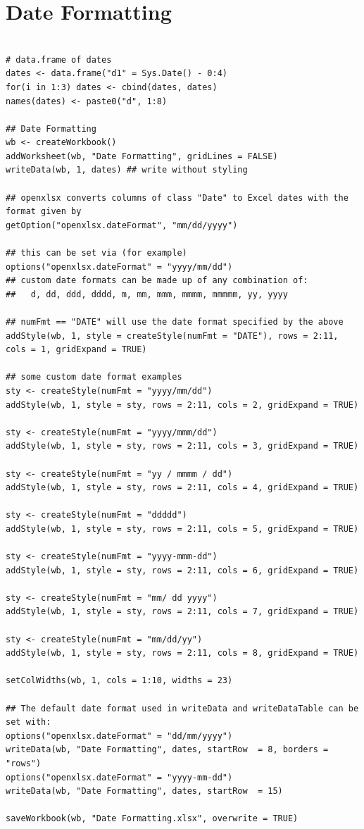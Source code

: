 \documentclass[11pt]{article}\usepackage[]{graphicx}\usepackage[]{color}
\begin{document}
\section{Date Formatting}
\begin{verbatim}

# data.frame of dates
dates <- data.frame("d1" = Sys.Date() - 0:4)
for(i in 1:3) dates <- cbind(dates, dates)
names(dates) <- paste0("d", 1:8)

## Date Formatting
wb <- createWorkbook()
addWorksheet(wb, "Date Formatting", gridLines = FALSE)
writeData(wb, 1, dates) ## write without styling

## openxlsx converts columns of class "Date" to Excel dates with the format given by
getOption("openxlsx.dateFormat", "mm/dd/yyyy")

## this can be set via (for example)
options("openxlsx.dateFormat" = "yyyy/mm/dd")
## custom date formats can be made up of any combination of:
##   d, dd, ddd, dddd, m, mm, mmm, mmmm, mmmmm, yy, yyyy

## numFmt == "DATE" will use the date format specified by the above
addStyle(wb, 1, style = createStyle(numFmt = "DATE"), rows = 2:11, cols = 1, gridExpand = TRUE) 

## some custom date format examples
sty <- createStyle(numFmt = "yyyy/mm/dd")
addStyle(wb, 1, style = sty, rows = 2:11, cols = 2, gridExpand = TRUE)

sty <- createStyle(numFmt = "yyyy/mmm/dd")
addStyle(wb, 1, style = sty, rows = 2:11, cols = 3, gridExpand = TRUE)

sty <- createStyle(numFmt = "yy / mmmm / dd")
addStyle(wb, 1, style = sty, rows = 2:11, cols = 4, gridExpand = TRUE)

sty <- createStyle(numFmt = "ddddd")
addStyle(wb, 1, style = sty, rows = 2:11, cols = 5, gridExpand = TRUE)

sty <- createStyle(numFmt = "yyyy-mmm-dd")
addStyle(wb, 1, style = sty, rows = 2:11, cols = 6, gridExpand = TRUE)

sty <- createStyle(numFmt = "mm/ dd yyyy")
addStyle(wb, 1, style = sty, rows = 2:11, cols = 7, gridExpand = TRUE)

sty <- createStyle(numFmt = "mm/dd/yy")
addStyle(wb, 1, style = sty, rows = 2:11, cols = 8, gridExpand = TRUE)

setColWidths(wb, 1, cols = 1:10, widths = 23)

## The default date format used in writeData and writeDataTable can be set with:
options("openxlsx.dateFormat" = "dd/mm/yyyy")
writeData(wb, "Date Formatting", dates, startRow  = 8, borders = "rows")
options("openxlsx.dateFormat" = "yyyy-mm-dd")
writeData(wb, "Date Formatting", dates, startRow  = 15)

saveWorkbook(wb, "Date Formatting.xlsx", overwrite = TRUE)
\end{verbatim}
\end{document}
